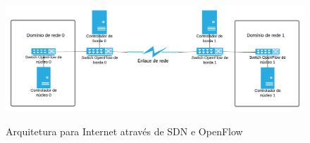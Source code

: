 \begin{figure}[h!]
    \centering
    \includegraphics[width=\textwidth]{img/edge-core-sdn}
    \label{fig:edge-core-sdn}
    \caption{Arquitetura para Internet através de SDN e OpenFlow}
\end{figure}
